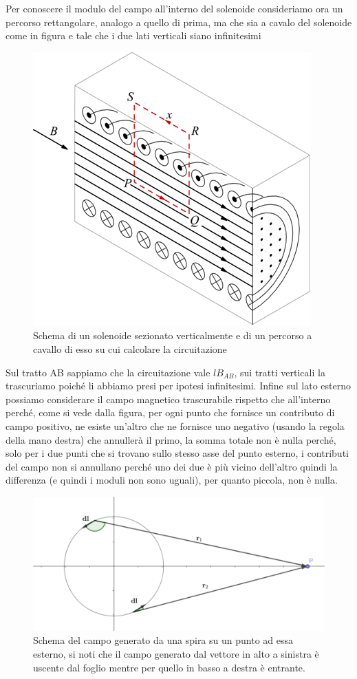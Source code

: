 \documentclass[10pt,a4paper]{article}
\begin{document}
Per conoscere il modulo del campo all'interno del solenoide consideriamo ora un percorso rettangolare, analogo a quello di prima, ma che sia a cavalo del solenoide come in figura e tale che i due lati verticali siano infinitesimi
\begin{figure}[h!]
	\centering
	\includegraphics[width=0.6\linewidth]{images/circuitazione_solenoide}
	\caption{Schema di un solenoide sezionato verticalmente e di un percorso a cavallo di esso su cui calcolare la circuitazione}
	\label{fig:circuitazionesolenoide}
\end{figure}
\FloatBarrier
Sul tratto AB sappiamo che la circuitazione vale \(lB_{AB}\), sui tratti verticali la trascuriamo poiché li abbiamo presi per ipotesi infinitesimi. Infine sul lato esterno possiamo considerare il campo magnetico trascurabile rispetto che all'interno perché, come si vede dalla figura, per ogni punto che fornisce un contributo di campo positivo, ne esiste un'altro che ne fornisce uno negativo (usando la regola della mano destra) che annullerà il primo, la somma totale non è nulla perché, solo per i due punti che si trovano sullo stesso asse del punto esterno, i contributi del campo non si annullano perché uno dei due è più vicino dell'altro quindi la differenza (e quindi i moduli non sono uguali), per quanto piccola, non è nulla. 
\begin{figure}[h!]
	\centering
	\includegraphics[width=0.7\linewidth]{images/campo_esterno_spira}
	\caption{Schema del campo generato da una spira su un punto ad essa esterno, si noti che il campo generato dal vettore in alto a sinistra è uscente dal foglio mentre per quello in basso a destra è entrante.}
	\label{fig:campoesternospira}
\end{figure}
\end{document}

